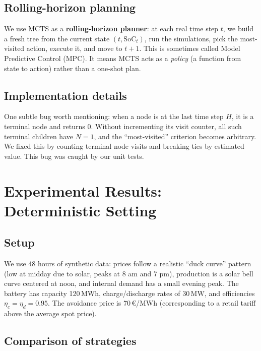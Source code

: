 \documentclass[12pt,a4paper]{article}
\newcommand{\soc}{\mathrm{SoC}}
\begin{document}
\subsection{Rolling-horizon planning}

We use MCTS as a \textbf{rolling-horizon planner}: at each real time step $t$,
we build a fresh tree from the current state $(t, \soc_t)$, run the
simulations, pick the most-visited action, execute it, and move to $t+1$.
This is sometimes called Model Predictive Control (MPC). It means MCTS acts as
a \emph{policy} (a function from state to action) rather than a one-shot plan.

\subsection{Implementation details}

One subtle bug worth mentioning: when a node is at the last time step $H$, it
is a terminal node and returns 0. Without incrementing its visit counter, all
such terminal children have $N=1$, and the ``most-visited'' criterion becomes
arbitrary. We fixed this by counting terminal node visits and breaking ties by
estimated value. This bug was caught by our unit tests.

\section{Experimental Results: Deterministic Setting}

\subsection{Setup}

We use 48 hours of synthetic data: prices follow a realistic ``duck curve''
pattern (low at midday due to solar, peaks at 8 am and 7 pm), production is a
solar bell curve centered at noon, and internal demand has a small evening
peak. The battery has capacity 120\,MWh, charge/discharge rates of
30\,MW, and efficiencies $\eta_c = \eta_d = 0.95$. The avoidance price is
70\,\euro/MWh (corresponding to a retail tariff above the average spot price).

\subsection{Comparison of strategies}
\end{document}
